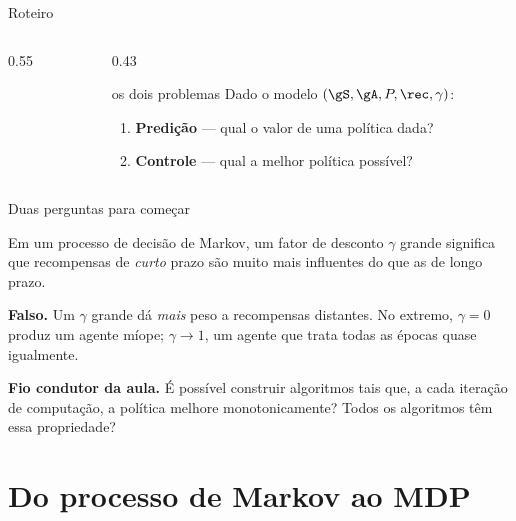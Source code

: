 \documentclass[aspectratio=169, 11pt]{beamer}
\begin{document}
\begin{frame}{Roteiro}
  \begin{columns}[T]
    \begin{column}{0.55\textwidth}
      \tableofcontents[hideallsubsections]
    \end{column}
    \begin{column}{0.43\textwidth}
      \begin{defbox}{os dois problemas}
        Dado o modelo $(\gS,\gA,P,\rec,\gamma)$:
        \begin{enumerate}\setlength{\itemsep}{0.2ex}
          \item \textbf{Predição} --- qual o valor de uma política dada?
          \item \textbf{Controle} --- qual a melhor política possível?
        \end{enumerate}
      \end{defbox}
    \end{column}
  \end{columns}
\end{frame}

\begin{frame}{Duas perguntas para começar}
  \begin{quizbox}{}
    Em um processo de decisão de Markov, um fator de desconto $\gamma$ \alert{grande}
    significa que recompensas de \emph{curto} prazo são muito mais influentes do que as
    de longo prazo.
  \end{quizbox}
  \pause
  \begin{respbox}
    \textbf{Falso.} Um $\gamma$ grande dá \emph{mais} peso a recompensas distantes.
    No extremo, $\gamma=0$ produz um agente míope; $\gamma \to 1$, um agente que trata
    todas as épocas quase igualmente.
  \end{respbox}
  \begin{ideiabox}
    \textbf{Fio condutor da aula.} É possível construir algoritmos tais que, a cada
    iteração de computação, a política melhore \alert{monotonicamente}? Todos os
    algoritmos têm essa propriedade?
  \end{ideiabox}
\end{frame}

\section{Do processo de Markov ao MDP}
\end{document}
